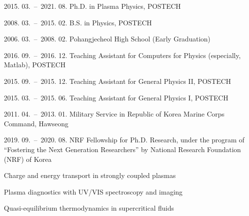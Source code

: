 
\begin{personaldata}
\end{personaldata}

\begin{education}
    \item[2015. 03.\ --\ 2021. 08.] Ph.D. in Plasma Physics, POSTECH
    \item[2008. 03.\ --\ 2015. 02.] B.S. in Physics, POSTECH
    \item[2006. 03.\ --\ 2008. 02.] Pohangjecheol High School (Early Graduation)
\end{education}

\begin{experience}
    \item[2016. 09.\ --\ 2016. 12.] Teaching Assistant for Computers for Physics (especially, Matlab), POSTECH
    \item[2015. 09.\ --\ 2015. 12.] Teaching Assistant for General Physics II, POSTECH
    \item[2015. 03.\ --\ 2015. 06.] Teaching Assistant for General Physics I, POSTECH
    \item[2011. 04.\ --\ 2013. 01.] Military Service in Republic of Korea Marine Corps Command, Hawseong
\end{experience}

\begin{fellowship}
    \item[2019. 09.\ --\ 2020. 08.] NRF Fellowship for Ph.D. Research, under the program of “Fostering the Next Generation Researchers” by National Research Foundation (NRF) of Korea
\end{fellowship}

\begin{interest}
    \item Charge and energy transport in strongly coupled plasmas
    \item Plasma diagnostics with UV/VIS spectroscopy and imaging
    \item Quasi-equilibrium thermodynamics in supercritical fluids
\end{interest}

